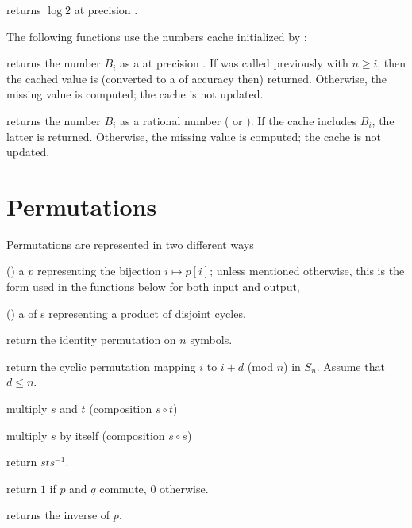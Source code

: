  returns $\log 2$ at precision .

The following functions use the  numbers cache initialized by
:

 returns the  number
$B_i$ as a  at precision . If 
was called previously with $n \geq i$, then the cached value is (converted to
a  of accuracy  then) returned. Otherwise, the missing
value is computed; the cache is not updated.

 returns the  number $B_i$ as a
rational number ( or ). If the  cache includes
$B_i$, the latter is returned. Otherwise, the missing value is computed; the
cache is not updated.



\section{Permutations }

\noindent Permutations are represented in two different ways

\item () a  $p$ representing the bijection $i\mapsto
p[i]$; unless mentioned otherwise, this is the form used in the functions
below for both input and output,

\item () a  of s representing a product of
disjoint cycles.

 return the identity permutation on $n$
symbols.

 return the cyclic permutation mapping
$i$ to $i+d$ (mod $n$) in $S_n$. Assume that $d \leq n$.

 multiply $s$ and $t$ (composition $s\circ t$)

 multiply $s$  by itself (composition $s\circ s$)

 return $sts^{-1}$.

 return $1$ if $p$ and $q$ commute, 0
otherwise.

 returns the inverse of $p$.

